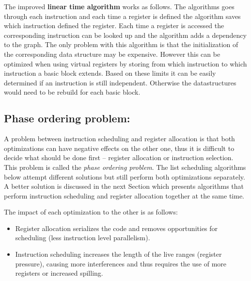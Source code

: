 \documentclass[a4paper,10pt]{article}
\begin{document}
The improved \textbf{linear time algorithm} works as follows. The algorithms goes through each instruction and each time a register is 
defined the algorithm saves which instruction defined the register. Each time a register is accessed the corresponding instruction can be 
looked up and the algorithm adds a dependency to the graph. The only problem with this algorithm is that the initialization of the 
corresponding data structure may be expensive. However this can be optimized when using virtual registers by storing from which 
instruction to which instruction a basic block extends. Based on these limits it can be easily determined if an instruction is still 
independent. Otherwise the datastructures would need to be rebuild for each basic block.

\subsection{Phase ordering problem:}
A problem between instruction scheduling and register allocation is that both optimizations can have negative effects on the other one, 
thus it is difficult to decide what should be done first -- register allocation or instruction selection. This problem is called the
\textit{phase ordering problem}. The list scheduling algorithms below attempt different solutions but still perform both optimizations 
separately. A better solution is discussed in the next Section which presents algorithms that perform instruction scheduling and register
allocation together at the same time.

The impact of each optimization to the other is as follows:
\begin{itemize}
 \item Register allocation serializes the code and removes opportunities for scheduling (less instruction level parallelism).
 \item Instruction scheduling increases the length of the live ranges (register pressure), causing more interferences and thus requires 
       the use of more registers or increased spilling.
\end{itemize}
\end{document}
